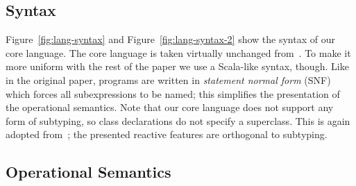 \documentclass{acm_proc_article-sp}
\begin{document}
\subsection{Syntax}

Figure~\ref{fig:lang-syntax} and Figure~\ref{fig:lang-syntax-2} show the
syntax of our core language. The core language is taken virtually unchanged
from~\cite{FormalizingAsync}. To make it more uniform with the rest of the
paper we use a Scala-like syntax, though. Like in the original paper, programs
are written in {\em statement normal form} (SNF) which forces all
subexpressions to be named; this simplifies the presentation of the
operational semantics. Note that our core language does not support any form
of subtyping, so class declarations do not specify a superclass. This is again
adopted from~\cite{FormalizingAsync}; the presented reactive features are
orthogonal to subtyping.

\subsection{Operational Semantics}
\end{document}
